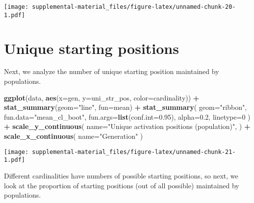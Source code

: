 \documentclass[]{book}
\newenvironment{Shaded}{\begin{snugshade}}{\end{snugshade}}
\newcommand{\DataTypeTok}[1]{\textcolor[rgb]{0.13,0.29,0.53}{#1}}
\newcommand{\DecValTok}[1]{\textcolor[rgb]{0.00,0.00,0.81}{#1}}
\newcommand{\FloatTok}[1]{\textcolor[rgb]{0.00,0.00,0.81}{#1}}
\newcommand{\KeywordTok}[1]{\textcolor[rgb]{0.13,0.29,0.53}{\textbf{#1}}}
\newcommand{\NormalTok}[1]{#1}
\newcommand{\OperatorTok}[1]{\textcolor[rgb]{0.81,0.36,0.00}{\textbf{#1}}}
\newcommand{\StringTok}[1]{\textcolor[rgb]{0.31,0.60,0.02}{#1}}
\begin{document}
\texttt{[image: supplemental-material\_files/figure-latex/unnamed-chunk-20-1.pdf]}

\hypertarget{unique-starting-positions-1}{%
\section{Unique starting positions}\label{unique-starting-positions-1}}

Next, we analyze the number of unique starting position maintained by populations.

\begin{Shaded}
\begin{Highlighting}[]
\KeywordTok{ggplot}\NormalTok{(data, }\KeywordTok{aes}\NormalTok{(}\DataTypeTok{x=}\NormalTok{gen, }\DataTypeTok{y=}\NormalTok{uni_str_pos, }\DataTypeTok{color=}\NormalTok{cardinality)) }\OperatorTok{+}
\StringTok{  }\KeywordTok{stat_summary}\NormalTok{(}\DataTypeTok{geom=}\StringTok{"line"}\NormalTok{, }\DataTypeTok{fun=}\NormalTok{mean) }\OperatorTok{+}
\StringTok{  }\KeywordTok{stat_summary}\NormalTok{(}
    \DataTypeTok{geom=}\StringTok{"ribbon"}\NormalTok{,}
    \DataTypeTok{fun.data=}\StringTok{"mean_cl_boot"}\NormalTok{,}
    \DataTypeTok{fun.args=}\KeywordTok{list}\NormalTok{(}\DataTypeTok{conf.int=}\FloatTok{0.95}\NormalTok{),}
    \DataTypeTok{alpha=}\FloatTok{0.2}\NormalTok{,}
    \DataTypeTok{linetype=}\DecValTok{0}
\NormalTok{  ) }\OperatorTok{+}
\StringTok{  }\KeywordTok{scale_y_continuous}\NormalTok{(}
    \DataTypeTok{name=}\StringTok{"Unique activation positions (population)"}\NormalTok{,}
\NormalTok{  ) }\OperatorTok{+}
\StringTok{  }\KeywordTok{scale_x_continuous}\NormalTok{(}
    \DataTypeTok{name=}\StringTok{"Generation"}
\NormalTok{  )}
\end{Highlighting}
\end{Shaded}

\texttt{[image: supplemental-material\_files/figure-latex/unnamed-chunk-21-1.pdf]}

Different cardinalities have numbers of possible starting positions, so next, we look at the proportion of starting positions (out of all possible) maintained by populations.
\end{document}
